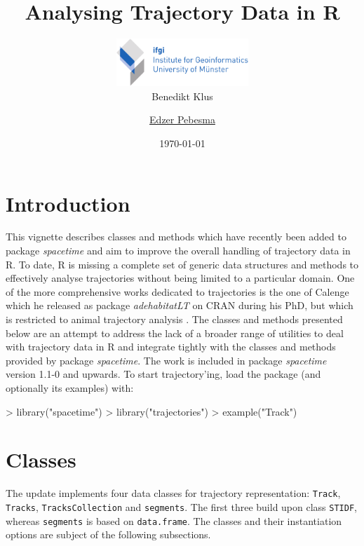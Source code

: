 \documentclass{article}
\title{Analysing Trajectory Data in R}
\author{
\includegraphics[width=5cm]{ifgi-logo_int} \\ %
Benedikt Klus \and
\href{mailto:edzer.pebesma@uni-muenster.de}{Edzer Pebesma}
}
\date{\today}
\newcommand{\code}[1]{{\tt #1}}
\begin{document}


\maketitle

\tableofcontents

\newpage

\section{Introduction}

This vignette describes classes and methods which have recently been added to package \emph{spacetime} \cite{pebesma12, bivand13} and aim to improve the overall handling of trajectory data in R. To date, R is missing a complete set of generic data structures and methods to effectively analyse trajectories without being limited to a particular domain. One of the more comprehensive works dedicated to trajectories is the one of Calenge which he released as package \emph{adehabitatLT} on CRAN during his PhD, but which is restricted to animal trajectory analysis \cite{calenge06}. The classes and methods presented below are an attempt to address the lack of a broader range of utilities to deal with trajectory data in R and integrate tightly with the classes and methods provided by package \emph{spacetime}. The work is included in package \emph{spacetime} version 1.1-0 and upwards. To start trajectory'ing, load the package (and optionally its examples) with:

\begin{Schunk}
\begin{Sinput}
> library("spacetime")
> library("trajectories")
> example("Track")
\end{Sinput}
\end{Schunk}

\section{Classes}

The update implements four data classes for trajectory representation: \code{Track}, \code{Tracks}, \code{TracksCollection} and \code{segments}. The first three build upon class \code{STIDF}, whereas \code{segments} is based on \code{data.frame}. The classes and their instantiation options are subject of the following subsections.
\end{document}
